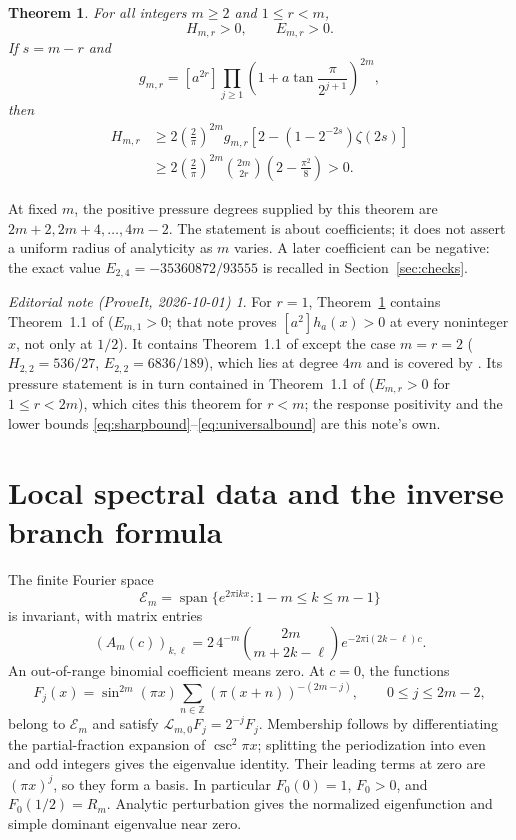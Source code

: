 \documentclass[11pt,a4paper]{article}
\newtheorem{theorem}{Theorem}[section]
\theoremstyle{remark}\newtheorem*{ednote}{Editorial note (ProveIt, 2026-10-01)}
\newcommand{\Z}{\mathbb Z}\newcommand{\E}{\mathcal E}\newcommand{\ii}{\mathrm i}
\newcommand{\Lop}{\mathcal L}
\begin{document}
\begin{theorem}\label{thm:main}
For all integers $m\ge2$ and $1\le r<m$,
\[
 H_{m,r}>0,\qquad E_{m,r}>0.
\]
If $s=m-r$ and
\[
 g_{m,r}=[a^{2r}]\prod_{j\ge1}
 \left(1+a\tan\frac{\pi}{2^{j+1}}\right)^{2m},
\]
then
\begin{align}
 H_{m,r}
 &\ge 2\left(\frac2\pi\right)^{2m}g_{m,r}
       \left[2-(1-2^{-2s})\zeta(2s)\right]\label{eq:sharpbound}\\
 &\ge 2\left(\frac2\pi\right)^{2m}\binom{2m}{2r}
       \left(2-\frac{\pi^2}{8}\right)>0.\label{eq:universalbound}
\end{align}
\end{theorem}
At fixed $m$, the positive pressure degrees supplied by this theorem are $2m+2,2m+4,\ldots,4m-2$. The statement is about coefficients; it does not assert a uniform radius of analyticity as $m$ varies. A later coefficient can be negative: the exact value $E_{2,4}=-35360872/93555$ is recalled in Section~\ref{sec:checks}.
\begin{ednote}
For $r=1$, Theorem~\ref{thm:main} contains Theorem~1.1 of 
($E_{m,1}>0$; that note proves $[a^2]h_a(x)>0$ at every noninteger $x$, not only at $1/2$).
It contains Theorem~1.1 of  except the case $m=r=2$
($H_{2,2}=536/27$, $E_{2,2}=6836/189$), which lies at degree $4m$ and is covered by
. Its pressure statement is in turn contained in
Theorem~1.1 of  ($E_{m,r}>0$ for $1\le r<2m$), which cites this
theorem for $r<m$; the response positivity and the lower bounds
\eqref{eq:sharpbound}--\eqref{eq:universalbound} are this note's own.
\end{ednote}

\section{Local spectral data and the inverse branch formula}
The finite Fourier space
\[
 \E_m=\operatorname{span}\{e^{2\pi\ii kx}:1-m\le k\le m-1\}
\]
is invariant, with matrix entries
\begin{equation}\label{eq:fourier}
 (A_m(c))_{k,\ell}=2\,4^{-m}\binom{2m}{m+2k-\ell}
                   e^{-2\pi\ii(2k-\ell)c}.
\end{equation}
An out-of-range binomial coefficient means zero. At $c=0$, the functions
\[
 F_j(x)=\sin^{2m}(\pi x)
       \sum_{n\in\Z}(\pi(x+n))^{-(2m-j)},
 \qquad 0\le j\le2m-2,
\]
belong to $\E_m$ and satisfy $\Lop_{m,0}F_j=2^{-j}F_j$. Membership follows by differentiating the partial-fraction expansion of $\csc^2\pi x$; splitting the periodization into even and odd integers gives the eigenvalue identity. Their leading terms at zero are $(\pi x)^j$, so they form a basis. In particular $F_0(0)=1$, $F_0>0$, and $F_0(1/2)=R_m$. Analytic perturbation gives the normalized eigenfunction and simple dominant eigenvalue near zero.
\end{document}
